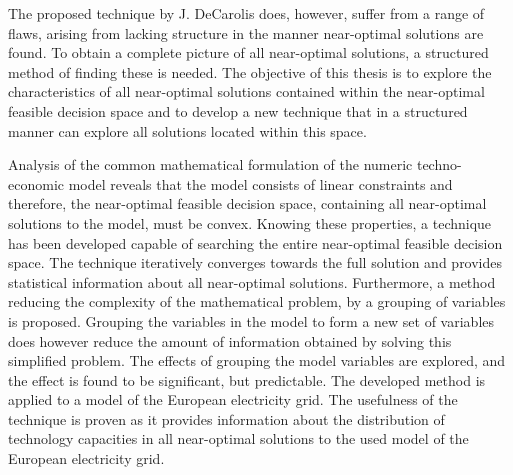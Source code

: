 \begin{adjustwidth}{-10pt}{-20pt}
The proposed technique by J. DeCarolis does, however, suffer from a range of flaws, arising from lacking structure in the manner near-optimal solutions are found. To obtain a complete picture of all near-optimal solutions, a structured method of finding these is needed. 
The objective of this thesis is to explore the characteristics of all near-optimal solutions contained within the near-optimal feasible decision space and to develop a new technique that in a structured manner can explore all solutions located within this space.  


Analysis of the common mathematical formulation of the numeric techno-economic model reveals that the model consists of linear constraints and therefore, the near-optimal feasible decision space, containing all near-optimal solutions to the model, must be convex. 
Knowing these properties, a technique has been developed capable of searching the entire near-optimal feasible decision space. The technique iteratively converges towards the full solution and provides statistical information about all near-optimal solutions. 
Furthermore, a method reducing the complexity of the mathematical problem, by a grouping of variables is proposed. Grouping the variables in the model to form a new set of variables does however reduce the amount of information obtained by solving this simplified problem. The effects of grouping the model variables are explored, and the effect is found to be significant, but predictable. 
The developed method is applied to a model of the European electricity grid. The usefulness of the technique is proven as it provides information about the distribution of technology capacities in all near-optimal solutions to the used model of the European electricity grid. 


\end{adjustwidth}






